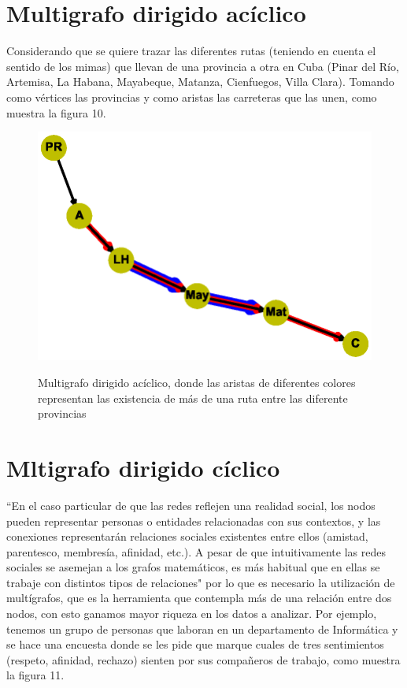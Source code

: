 \documentclass{article}
\begin{document}
\section{Multigrafo dirigido acíclico}
Considerando que se quiere trazar las diferentes rutas (teniendo en cuenta el sentido de los mimas) que llevan de una provincia a otra en Cuba (Pinar del Río, Artemisa, La Habana, Mayabeque, Matanza, Cienfuegos, Villa Clara). Tomando como vértices las provincias y como aristas las carreteras que las unen, como muestra la figura 10.
\begin{center}

\end{center}
\begin{figure}[h]
\begin{center}
\includegraphics[scale=0.7]{Graf10.eps}\\
\caption{Multigrafo dirigido acíclico, donde las aristas de diferentes colores representan las existencia de más de una ruta entre las diferente provincias}
\end{center}
\end{figure}

\section{Mltigrafo dirigido cíclico}
``En el caso particular de que las redes reflejen una realidad social, los nodos pueden representar personas o entidades relacionadas con sus contextos, y las conexiones representarán relaciones sociales existentes entre ellos (amistad, parentesco, membresía, afinidad, etc.). A pesar de que intuitivamente las redes sociales se asemejan a los grafos matemáticos, es más habitual que en ellas se trabaje con distintos tipos de relaciones"\cite{gf3} por lo que es necesario la utilización de multígrafos, que es la herramienta que contempla más de una relación entre dos nodos, con esto ganamos mayor riqueza en los datos a analizar.\linebreak 
Por ejemplo, tenemos un grupo de personas que laboran en un departamento de Informática y se hace una encuesta donde se les pide que marque cuales de tres sentimientos (respeto, afinidad, rechazo) sienten por sus compañeros de trabajo, como muestra la figura 11.
\end{document}

